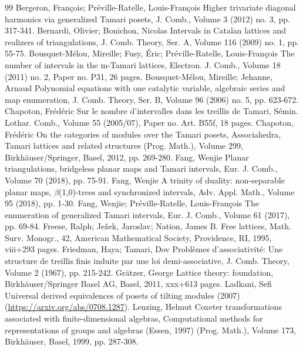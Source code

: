\documentclass[10pt]{article}
\theoremstyle{definition}
\begin{document}
\begin{thebibliography}{99}
 Bergeron, François; Préville-Ratelle, Louis-François Higher trivariate diagonal harmonics via generalized Tamari posets, J. Comb., Volume 3 (2012) no. 3, pp. 317-341.
 Bernardi, Olivier; Bonichon, Nicolas Intervals in Catalan lattices and realizers of triangulations, J. Comb. Theory, Ser. A, Volume 116 (2009) no. 1, pp. 55-75.
 Bousquet-Mélou, Mireille; Fusy, Éric; Préville-Ratelle, Louis-François The number of intervals in the m-Tamari lattices, Electron. J. Comb., Volume 18 (2011) no. 2, Paper no. P31, 26 pages.
 Bousquet-Mélou, Mireille; Jehanne, Arnaud Polynomial equations with one catalytic variable, algebraic series and map enumeration, J. Comb. Theory, Ser. B, Volume 96 (2006) no. 5, pp. 623-672.
 Chapoton, Frédéric Sur le nombre d’intervalles dans les treillis de Tamari, Sémin. Lothar. Comb., Volume 55 (2005/07), Paper no. Art. B55f, 18 pages.
 Chapoton, Frédéric On the categories of modules over the Tamari posets, Associahedra, Tamari lattices and related structures (Prog. Math.), Volume 299, Birkhäuser/Springer, Basel, 2012, pp. 269-280.
 Fang, Wenjie Planar triangulations, bridgeless planar maps and Tamari intervals, Eur. J. Comb., Volume 70 (2018), pp. 75-91.
 Fang, Wenjie A trinity of duality: non-separable planar maps, \(\beta\)(1,0)-trees and synchronized intervals, Adv. Appl. Math., Volume 95 (2018), pp. 1-30.
 Fang, Wenjie; Préville-Ratelle, Louis-François The enumeration of generalized Tamari intervals, Eur. J. Comb., Volume 61 (2017), pp. 69-84.
 Freese, Ralph; Ježek, Jaroslav; Nation, James B. Free lattices, Math. Surv. Monogr., 42, American Mathematical Society, Providence, RI, 1995, viii+293 pages.
 Friedman, Haya; Tamari, Dov Problèmes d’associativité: Une structure de treillis finis induite par une loi demi-associative, J. Comb. Theory, Volume 2 (1967), pp. 215-242.
 Grätzer, George Lattice theory: foundation, Birkhäuser/Springer Basel AG, Basel, 2011, xxx+613 pages.
 Ladkani, Sefi Universal derived equivalences of posets of tilting modules (2007) (\url{https://arxiv.org/abs/0708.1287}).
 Lenzing, Helmut Coxeter transformations associated with finite-dimensional algebras, Computational methods for representations of groups and algebras (Essen, 1997) (Prog. Math.), Volume 173, Birkhäuser, Basel, 1999, pp. 287-308.

\end{thebibliography}
\end{document}
